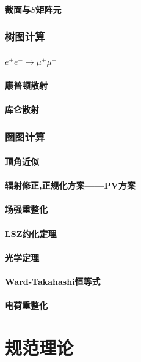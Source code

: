 \documentclass[a4paper,11pt]{article}
\begin{document}
\subsection{截面与$S$矩阵元}
\section{树图计算}
\subsection{$e^+e^-\rightarrow\mu^+\mu^-$}
\subsection{康普顿散射}
\subsection{库仑散射}
\section{圈图计算}
\subsection{顶角近似}
\subsection{辐射修正,正规化方案——PV方案}
\subsection{场强重整化}
\subsection{LSZ约化定理}
\subsection{光学定理}
\subsection{Ward-Takahashi恒等式}
\subsection{电荷重整化}
\part{规范理论}
\end{document}
